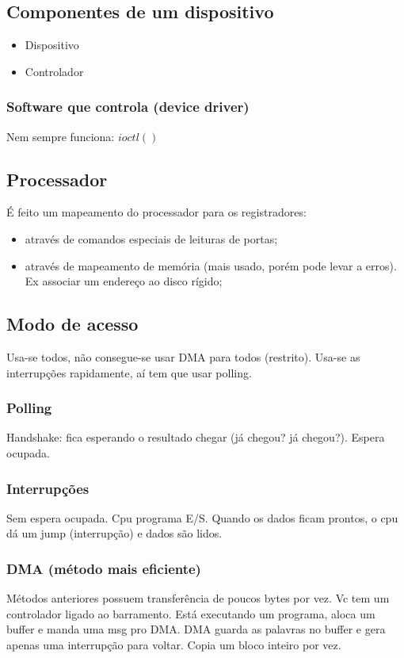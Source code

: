 \documentclass[11pt]{article}
\begin{document}
\subsection{Componentes de um dispositivo}
\label{sec:org05b80ee}
\begin{itemize}
\item Dispositivo
\item Controlador
\end{itemize}
\subsubsection{Software que controla (device driver)}
\label{sec:org6be19fc}
Nem sempre funciona: \(ioctl()\)

\subsection{Processador}
\label{sec:org1da4b15}
É feito um mapeamento do processador para os registradores:
\begin{itemize}
\item através de comandos especiais de leituras de portas;
\item através de mapeamento de memória (mais usado, porém pode levar a erros). Ex associar
um endereço ao disco rígido;
\end{itemize}

\subsection{Modo de acesso}
\label{sec:orgc9ed678}
Usa-se todos, não consegue-se usar DMA para todos (restrito). Usa-se as interrupções
rapidamente, aí tem que usar polling.
\subsubsection{Polling}
\label{sec:org6adf8bc}
Handshake: fica esperando o resultado chegar (já chegou? já chegou?). Espera ocupada.
\subsubsection{Interrupções}
\label{sec:org9a7dfe0}
Sem espera ocupada. Cpu programa E/S. Quando os dados ficam prontos, o cpu dá um jump
(interrupção) e dados são lidos.
\subsubsection{DMA (método mais eficiente)}
\label{sec:org0ddaeb0}
Métodos anteriores possuem transferência de poucos bytes por vez.  Vc tem um
controlador ligado ao barramento. Está executando um programa, aloca um buffer e manda
uma msg pro DMA. DMA guarda as palavras no buffer e gera apenas uma interrupção para
voltar. Copia um bloco inteiro por vez.
\end{document}
